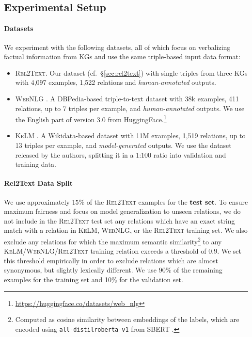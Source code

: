 \subsection{Experimental Setup}
\label{sec:setup}

\paragraph*{Datasets}  We experiment with the following datasets, all of which focus on verbalizing factual information from KGs and use the same triple-based input data format:
\begin{itemize}
    \item \textsc{Rel2Text}. Our dataset (cf.\ §\ref{sec:rel2text}) with single triples from three KGs with 4,097 examples, 1,522 relations and \textit{human-annotated} outputs.
    \item \textsc{WebNLG} \cite{ferreira20202020,gardent2017webnlg}. A DBPedia-based triple-to-text dataset with 38k examples, 411 relations, up to 7 triples per example, and \textit{human-annotated} outputs. We use the English part of version 3.0 from HuggingFace.\footnote{\url{https://huggingface.co/datasets/web_nlg}}
    \item \textsc{KeLM} \cite{agarwal2021knowledge}. A Wikidata-based dataset with 11M examples, 1,519 relations, up to 13 triples per example, and \textit{model-generated} outputs. We use the dataset released by the authors, splitting it in a 1:100 ratio into validation and training data.
\end{itemize}

\paragraph{Rel2Text Data Split} We use approximately 15\% of the \textsc{Rel2Text} examples for the \textbf{test set}. To ensure maximum fairness and focus on model generalization to unseen relations, we do not include in the \textsc{Rel2Text} test set any relations which have an exact string match with a relation in \textsc{KeLM}, \textsc{WebNLG}, or the \textsc{Rel2Text} training set. We also exclude any relations for which the maximum semantic similarity\footnote{Computed as cosine similarity between embeddings of the labels, which are encoded using \texttt{all-distilroberta-v1} from SBERT \cite{reimers-2019-sentence-bert}.} to any \textsc{KeLM}/\textsc{WebNLG}/\textsc{Rel2Text} training relation exceeds a threshold of $0.9$. We set this threshold empirically in order to exclude relations which are almost synonymous, but slightly lexically different.
We use 90\% of the remaining examples for the training set and 10\% for the validation set.

